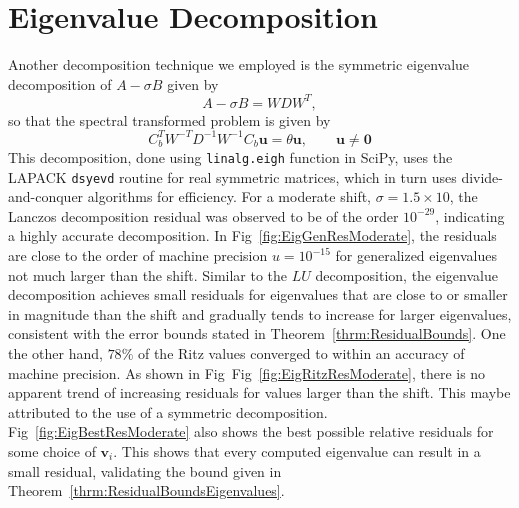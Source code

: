 

\section{Eigenvalue Decomposition}
Another decomposition technique we employed is the symmetric eigenvalue decomposition of $A-\sigma B$ given by
\begin{equation}
    A-\sigma B = WDW^T,
\end{equation}
so that the spectral transformed problem is given by
\begin{equation}\label{3.4}
	C_b^T W^{-T}D^{-1}W^{-1} C_b \mathbf{u} = \theta \mathbf{u}, \qquad \mathbf{u} \neq \mathbf{0}
\end{equation}
This decomposition, done using \texttt{linalg.eigh} function in SciPy, uses the LAPACK \texttt{dsyevd} routine for real symmetric matrices, which in turn uses divide-and-conquer algorithms for efficiency. For a moderate shift, $\sigma = 1.5 \times 10$, the Lanczos decomposition residual was observed to be of the order $10^{-29}$, indicating a highly accurate decomposition.
In Fig~\ref{fig:EigGenResModerate}, the residuals are close to the order of machine precision $u=10^{-15}$ for generalized eigenvalues not much larger than the shift. Similar to the $LU$ decomposition, the eigenvalue decomposition achieves small residuals for eigenvalues that are close to or smaller in magnitude than the shift and gradually tends to increase for larger eigenvalues, consistent with the error bounds stated in Theorem~\ref{thrm:ResidualBounds}. One the other hand, $78\%$ of the Ritz values converged to within an accuracy of machine precision. As shown in Fig~Fig~\ref{fig:EigRitzResModerate}, there is no apparent trend of increasing residuals for values larger than the shift. This maybe attributed to the use of a symmetric decomposition. Fig~\ref{fig:EigBestResModerate} also shows the best possible relative residuals for some choice of $\mathbf{v}_i$. This shows that every computed eigenvalue can result in a small residual, validating the bound given in Theorem~\ref{thrm:ResidualBoundsEigenvalues}.

